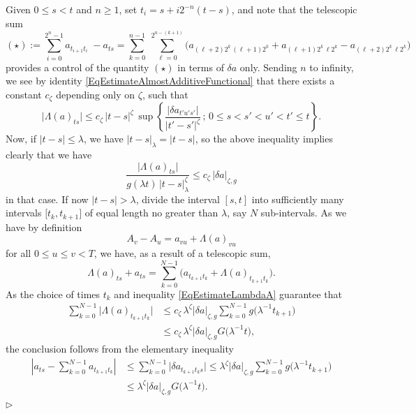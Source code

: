 \documentclass[11pt,a4paper]{amsart}
\renewcommand{\leq}{\leqslant}
\renewcommand{\geq}{\geqslant}
\numberwithin{equation}{section} %
\newenvironment{Dem}{%
    \begin{list}{\hspace{0.5cm}{\sc Proof --}}{%
        \setlength{\topsep}{0pt}%
        \setlength{\leftmargin}{0pt}%
        \setlength{\rightmargin}{0pt}%
        \setlength{\listparindent}{0pt}%
        \setlength{\itemindent}{0pt}%
        \setlength{\parsep}{0pt}%
        \addtolength{\leftmargin}{20pt}%
        \addtolength{\rightmargin}{0pt}%
    } \item }{\hfill{\space $\rhd$}\end{list}\smallskip}
\begin{document}
\begin{Dem}
Given $0\leq s<t$ and $n\geq 1$, set $t_i = s+i2^{-n}(t-s)$, and note that the telescopic sum
\begin{equation*}
(\star) := \sum_{i=0}^{2^n-1}a_{t_{i+1}t_i}\; - a_{ts} = \sum_{k=0}^{n-1}\;\sum_{\ell=0}^{2^{n-(k+1)}} \Big(a_{(\ell+2)2^k\,(\ell+1)2^k}+a_{(\ell+1)2^k\,\ell2^k} - a_{(\ell+2)2^k\,\ell2^k} \Big)
\end{equation*}
provides a control of the quantity $(\star)$ in terms of $\delta a$ only. Sending $n$ to infinity, we see by identity \eqref{EqEstimateAlmostAdditiveFunctional} that there exists a constant $c_\zeta$ depending only on $\zeta$, such that 
$$
\big| \Lambda(a)_{ts} \big| \leq c_\zeta \, |t-s|^\zeta \,\sup\left\{\frac{\big|\delta a_{t'u's'}\big|}{|t'-s'|^\zeta}\,;\,0\leq s<s'<u'<t'\leq t\right\}.
$$
Now, if $|t-s| \leq \lambda$, we have $|t-s|_\lambda = |t-s|$, so the above inequality implies clearly that we have
\begin{equation}
\label{EqEstimateLambdaA}
\frac{\big| \Lambda(a)_{ts} \big|}{g(\lambda t)\,|t-s|_\lambda^\zeta} \leq c_\zeta \, \big|\delta a\big|_{\zeta,g}
\end{equation}
in that case. If now $|t-s| >\lambda$, divide the interval $[s,t]$ into sufficiently many intervals $\big[t_k,t_{k+1}\big]$ of equal length no greater than $\lambda$, say $N$ sub-intervals. As we have by definition
$$
A_v - A_u = a_{vu} + \Lambda(a)_{vu}
$$
for all $0\leq u\leq v<T$, we have, as a result of a telescopic sum,
$$
\Lambda(a)_{ts} + a_{ts} = \sum_{k=0}^{N-1}\Big(  a_{t_{k+1}t_k} + \Lambda(a)_{t_{k+1}t_k}\Big).
$$
As the choice of times $t_k$ and inequality \eqref{EqEstimateLambdaA} guarantee that
\begin{equation*}
\begin{split}
\sum_{k=0}^{N-1} \Big|\Lambda(a)_{t_{k+1}t_k}\Big| &\leq c_\zeta \, \lambda^\zeta \big|\delta a\big|_{\zeta,g} \sum_{k=0}^{N-1} g\big(\lambda^{-1} t_{k+1}\big) \\
&\leq c_\zeta \, \lambda^\zeta \big|\delta a\big|_{\zeta,g} G\big(\lambda^{-1} t\big),
\end{split}
\end{equation*}
the conclusion follows from the elementary inequality
\begin{equation*}
\begin{split}
\left| a_{ts} - \sum_{k=0}^{N-1} a_{t_{k+1}t_k}\right| &\leq \sum_{k=0}^{N-1} \big|\delta a_{t_{k+1}t_k s}\big| \leq \lambda^\zeta \big|\delta a\big|_{\zeta,g} \sum_{k=0}^{N-1} g\big(\lambda^{-1} t_{k+1}\big) \\
&\leq \lambda^\zeta \big|\delta a\big|_{\zeta,g} G\big(\lambda^{-1} t\big).
\end{split}
\end{equation*}
\end{Dem}
\end{document}
